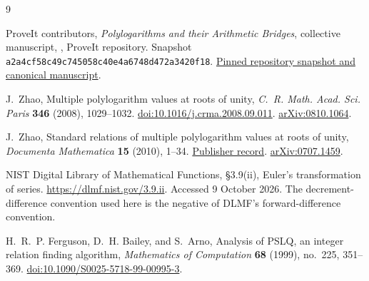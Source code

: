 \documentclass[11pt,letterpaper]{article}
\numberwithin{equation}{section}
\theoremstyle{definition}
\begin{document}
\begingroup
\small
\begin{thebibliography}{9}
\setlength{\itemsep}{4pt}
\raggedright
{}
ProveIt contributors,
\emph{Polylogarithms and their Arithmetic Bridges}, collective manuscript,
, ProveIt repository.
Snapshot \texttt{a2a4cf58c49c745058c40e4a6748d472a3420f18}.
\href{https://github.com/VladimirReshetnikov/ProveIt/tree/a2a4cf58c49c745058c40e4a6748d472a3420f18/Analysis/Polylogarithms/docs/manuscript}{Pinned repository snapshot and canonical manuscript}.

J.~Zhao, Multiple polylogarithm values at roots of unity,
\emph{C.~R. Math. Acad. Sci. Paris} \textbf{346} (2008), 1029--1032.
\href{https://doi.org/10.1016/j.crma.2008.09.011}{doi:10.1016/j.crma.2008.09.011}.
\href{https://arxiv.org/abs/0810.1064}{arXiv:0810.1064}.

J.~Zhao, Standard relations of multiple polylogarithm values at roots of
unity, \emph{Documenta Mathematica} \textbf{15} (2010), 1--34.
\href{https://ems.press/journals/dm/articles/8965225}{Publisher record}.
\href{https://arxiv.org/abs/0707.1459}{arXiv:0707.1459}.

NIST Digital Library of Mathematical Functions, \S3.9(ii),
Euler's transformation of series.
\url{https://dlmf.nist.gov/3.9.ii}.
Accessed 9 October 2026. The decrement-difference convention used here
is the negative of DLMF's forward-difference convention.

H.~R.~P. Ferguson, D.~H. Bailey, and S.~Arno,
Analysis of PSLQ, an integer relation finding algorithm,
\emph{Mathematics of Computation} \textbf{68} (1999), no.~225, 351--369.
\href{https://doi.org/10.1090/S0025-5718-99-00995-3}{doi:10.1090/S0025-5718-99-00995-3}.
\end{thebibliography}
\endgroup
\end{document}
